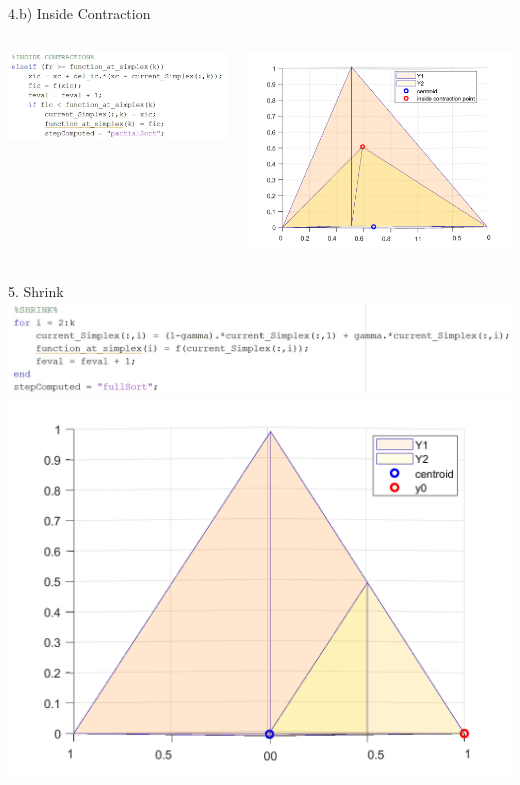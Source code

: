 \documentclass{beamer}
\begin{document}
\begin{frame}{4.b) Inside Contraction}
	\begin{columns}
	\begin{column}{0.39\linewidth}
		\centering
		\includegraphics[width=0.95\linewidth]{IC}
	\end{column}
	\begin{column}{0.59\linewidth}
		\centering
		\includegraphics[width=0.95\linewidth]{ICFig}
	\end{column}
	\end{columns}
\end{frame}

\begin{frame}{5. Shrink}
	\centering
	\includegraphics[width=0.85\linewidth]{Shrink} \\
	\includegraphics[width=0.65\linewidth]{ShrinkFig}
\end{frame}
\end{document}
